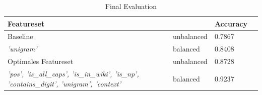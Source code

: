 \documentclass[a4paper, 11pt]{article}
\begin{document}
\begin{table}
					\centering
					\begin{tabular}{llll}
						Featureset & & Accuracy\\
						\toprule
						Baseline & unbalanced & 0.7867\\
						\small\color{blue}\textit{'unigram'} & balanced & 0.8408\\
						Optimales Featureset	 & unbalanced & 0.8728\\
						\small\color{blue}\textit{'pos', 'is\_all\_caps', 'is\_in\_wiki', 'is\_np', 'contains\_digit', 'unigram', 'context'}		 & balanced & 0.9237\\
						\bottomrule
					\end{tabular}
					\caption{Final Evaluation}
					\label{tab:Evaluation}
\end{table}
\end{document}
